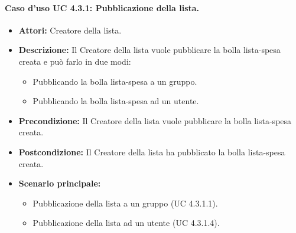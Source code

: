 \paragraph{Caso d'uso UC 4.3.1: Pubblicazione della lista.}
\label{Caso d'uso UC 4.3.1: Pubblicazione della lista.}

\FloatBarrier
\begin{itemize}
\item \textbf{Attori:} Creatore della lista.
\item \textbf{Descrizione:} Il Creatore della lista vuole pubblicare la bolla lista-spesa creata e può farlo in due modi:
\begin{itemize}
\item Pubblicando la bolla lista-spesa a un gruppo.
\item Pubblicando la bolla lista-spesa ad un utente.
\end{itemize}
\item \textbf{Precondizione:} Il Creatore della lista vuole pubblicare la bolla lista-spesa creata. 
\item \textbf{Postcondizione:} Il Creatore della lista ha pubblicato la bolla lista-spesa creata.
\item \textbf{Scenario principale:}
	\begin{itemize}
	\item{Pubblicazione della lista a un gruppo (UC 4.3.1.1).}
	\item{Pubblicazione della lista ad un utente (UC 4.3.1.4).}
	\end{itemize}
\end{itemize}